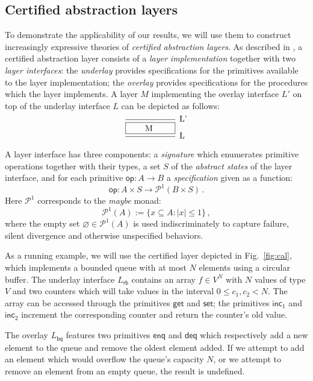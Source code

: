 \documentclass[sigplan,screen]{acmart}
\newcommand{\kw}[1]{\ensuremath{ \mathsf{#1} }}
\begin{document}

\subsection{Certified abstraction layers} %

To demonstrate the applicability of our results,
we will use them to construct
increasingly expressive theories of
\emph{certified abstraction layers}.
As described in \cite{popl15},
a certified abstraction layer
consists of a \emph{layer implementation} together with
two \emph{layer interfaces}:
the \emph{underlay} provides specifications for
the primitives available to the layer implementation;
the \emph{overlay} provides specifications for
the procedures which the layer implements.
A layer $M$ implementing the overlay interface $L'$
on top of the underlay interface $L$ can be depicted as follows:
\[
  \begin{prooftree}
    \infer0[L']{\fbox{\qquad M \qquad}}
    \infer1[L]{}
  \end{prooftree}
\]

A layer interface has three components:
a \emph{signature} which enumerates
primitive operations together with their types,
a set $S$ of the \emph{abstract states} of the layer interface,
and for each primitive
$\kw{op} : A \rightarrow B$
a \emph{specification}
given as a function:
\[
  \kw{op} : A \times S \rightarrow \mathcal{P}^1(B \times S) \,.
\]
Here $\mathcal{P}^1$ corresponds to the \emph{maybe} monad:
\[
  \mathcal{P}^1(A) := \{ x \subseteq A : |x| \le 1 \} \,,
\]
where the empty set $\varnothing \in \mathcal{P}^1(A)$
is used indiscriminately to capture
failure, silent divergence and otherwise unspecified behaviors.

As a running example,
we will use the certified layer
depicted in Fig.~\ref{fig:cal},
which implements a bounded queue with at most $N$ elements
using a circular buffer.
The underlay interface $L_\kw{rb}$
contains an array $f \in V^N$
with $N$ values of type $V$ and two counters
which will take values in the interval $0 \le c_1, c_2 < N$.
The array can be accessed through the primitives
$\kw{get}$ and $\kw{set}$;
the primitives $\kw{inc}_1$ and $\kw{inc}_2$
increment the corresponding counter
and return the counter's old value.

The overlay $L_\kw{bq}$ features two primitives
$\kw{enq}$ and $\kw{deq}$
which respectively add a new element to the queue
and remove the oldest element added.
If we attempt to add an element
which would overflow the queue's capacity $N$,
or we attempt to remove an element from an empty queue,
the result is undefined.
\end{document}
